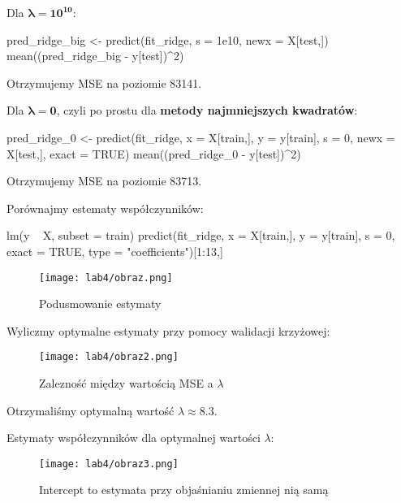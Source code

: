 Dla \(\boldsymbol{\lambda = 10^{10}}\):
\begin{Rcode}
pred_ridge_big <- predict(fit_ridge, s = 1e10, newx = X[test,])
mean((pred_ridge_big - y[test])^2)
\end{Rcode}

Otrzymujemy MSE na poziomie 83141.


Dla \(\boldsymbol{\lambda = 0}\), czyli po prostu dla \textbf{metody najmniejszych kwadratów}:
\begin{Rcode}
pred_ridge_0 <- predict(fit_ridge, x = X[train,], y = y[train], s = 0, 
                      newx = X[test,], exact = TRUE)
mean((pred_ridge_0 - y[test])^2)
\end{Rcode}

Otrzymujemy MSE na poziomie 83713.


Porównajmy estematy współczynników:
\begin{Rcode}
lm(y ~ X, subset = train)
predict(fit_ridge, x = X[train,], y = y[train], s = 0, exact = TRUE, 
        type = "coefficients")[1:13,]
\end{Rcode}

\begin{figure}[H]
    \centering
    \texttt{[image: lab4/obraz.png]}
    \caption{Podusmowanie estymaty}
    \label{fig:enter-label}
\end{figure}

Wyliczmy optymalne estymaty przy pomocy walidacji krzyżowej:


\begin{figure}[H]
    \centering
    \texttt{[image: lab4/obraz2.png]}
    \caption{Zalezność między wartością MSE a $\lambda$}
    \label{fig:enter-label}
\end{figure}

Otrzymaliśmy optymalną wartość $\lambda {}$. 

Estymaty współczynników dla optymalnej wartości $\lambda$:

\begin{figure}[H]
    \centering
    \texttt{[image: lab4/obraz3.png]}
    \caption{Intercept to estymata przy objaśnianiu zmiennej nią samą}
    \label{fig:enter-label}
\end{figure}

